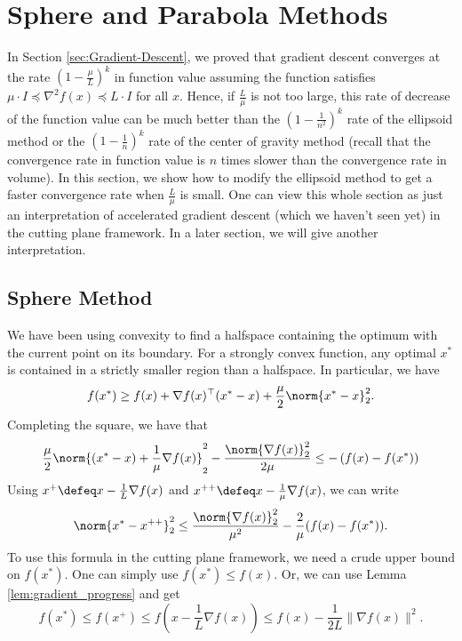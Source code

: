 
\section{Sphere and Parabola Methods}

In Section \ref{sec:Gradient-Descent}, we proved that gradient descent
converges at the rate $(1-\frac{\mu}{L})^{k}$ in function value assuming
the function satisfies $\mu\cdot I\preceq\nabla^{2}f(x)\preceq L\cdot I$
for all $x$. Hence, if $\frac{L}{\mu}$ is not too large, this rate
of decrease of the function value can be much better than the $\left(1-\frac{1}{n^{2}}\right)^{k}$
rate of the ellipsoid method or the $\left(1-\frac{1}{n}\right)^{k}$
rate of the center of gravity method (recall that the convergence
rate in function value is $n$ times slower than the convergence rate
in volume). In this section, we show how to modify the ellipsoid method
to get a faster convergence rate when $\frac{L}{\mu}$ is small. One
can view this whole section as just an interpretation of accelerated
gradient descent (which we haven't seen yet) in the cutting plane
framework. In a later section, we will give another interpretation.

\subsection{Sphere Method}

We have been using convexity to find a halfspace containing the optimum
with the current point on its boundary. For a strongly convex function,
any optimal $x^{*}$ is contained in a strictly smaller region than
a halfspace. In particular, we have
\[
f(x^{*})\geq f(x)+\nabla f(x)^{\top}(x^{*}-x)+\frac{\mu}{2}\norm{x^{*}-x}_{2}^{2}.
\]
Completing the square, we have that
\[
\frac{\mu}{2}\norm{(x^{*}-x)+\frac{1}{\mu}\nabla f(x)}_{2}^{2}-\frac{\norm{\nabla f(x)}_{2}^{2}}{2\mu}\le-\left(f(x)-f(x^{*})\right)
\]
Using $x^{+}\defeq x-\frac{1}{L}\nabla f(x)$ and $x^{++}\defeq x-\frac{1}{\mu}\nabla f(x)$,
we can write
\begin{equation}
\norm{x^{*}-x^{++}}_{2}^{2}\leq\frac{\norm{\nabla f(x)}_{2}^{2}}{\mu^{2}}-\frac{2}{\mu}(f(x)-f(x^{*})).\label{eq:geometricdescent_ball-1}
\end{equation}
To use this formula in the cutting plane framework, we need a crude
upper bound on $f(x^{*})$. One can simply use $f(x^{*})\leq f(x)$.
Or, we can use Lemma \ref{lem:gradient_progress} and get
\[
f(x^{*})\leq f(x^{+})\le f(x-\frac{1}{L}\nabla f(x))\leq f(x)-\frac{1}{2L}\|\nabla f(x)\|^{2}.
\]

